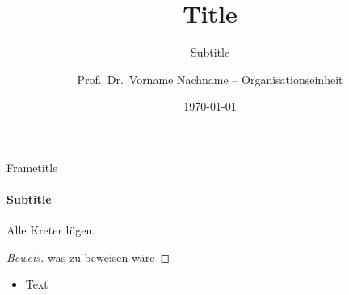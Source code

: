 \documentclass{ub-beamer}
\title[\textcolor{black}{shorttitle}]{Title}
\subtitle{Subtitle}
\date[2023]{\today}
\author[Nachname et~al.]{Prof.\ Dr.\ Vorname Nachname -- Organisationseinheit}
\begin{document}
\begin{frame}
\titlepage
\end{frame}
\begin{frame}{Frametitle}
\framesubtitle{Subtitle}
\begin{theorem}
Alle Kreter lügen.
\end{theorem}
\begin{proof}[Beweis]
was zu beweisen wäre
\end{proof}
\begin{itemize}
	\item Text
\end{itemize}
\end{frame}
\end{document}
